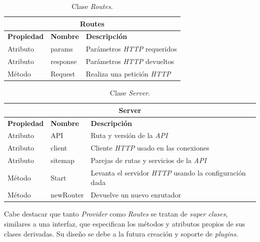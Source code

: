 \begin{table}[H]
    \begin{center}
        \begin{tabularx}{\textwidth}{| l | l | X |}
            \hline
            \multicolumn{3}{c}{ \textbf{Routes} } \\ \hline
            \textbf{Propiedad} & \textbf{Nombre} & \textbf{Descripción} \\ \hline
            Atributo & params & Parámetros \textit{HTTP} requeridos  \\ \hline
            Atributo & response & Parámetros \textit{HTTP} devueltos \\ \hline
            Método & Request & Realiza una petición \textit{HTTP} \\ \hline
        \end{tabularx}
    \end{center}
    \caption{Clase \textit{Routes}.}
    \label{tab:classRoutes}
\end{table}

\begin{table}[H]
    \begin{center}
        \begin{tabularx}{\textwidth}{| l | l | X |}
            \hline
            \multicolumn{3}{c}{ \textbf{Server} } \\ \hline
            \textbf{Propiedad} & \textbf{Nombre} & \textbf{Descripción} \\ \hline
            Atributo & API & Ruta y versión de la \textit{API} \\ \hline
            Atributo & client & Cliente \textit{HTTP} usado en las conexiones \\ \hline
            Atributo & sitemap & Parejas de rutas y servicios de la \textit{API} \\ \hline
            Método & Start & Levanta el servidor \textit{HTTP} usando la configuración dada \\ \hline
            Método & newRouter & Devuelve un nuevo enrutador \\ \hline
        \end{tabularx}
    \end{center}
    \caption{Clase \textit{Server}.}
    \label{tab:classServer}
\end{table}

Cabe destacar que tanto \textit{Provider} como \textit{Routes} se tratan de \textit{super clases}, similares a una interfaz, que especifican los métodos y atributos propios de sus clases derivadas. Su diseño se debe a la futura creación y soporte de \textit{plugins}.\n

